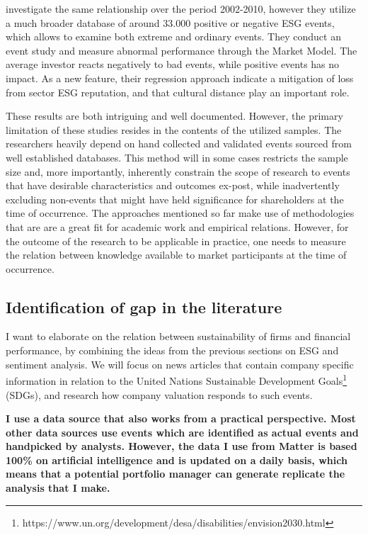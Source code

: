 \cite{Blancard_ESG_sentiment} investigate the same relationship over the period 2002-2010, however they utilize a much broader database of around 33.000 positive or negative ESG events, which allows to examine both extreme and ordinary events. They conduct an event study and measure abnormal performance through the Market Model. The average investor reacts negatively to bad events, while positive events has no impact. As a new feature, their regression approach indicate a mitigation of loss from sector ESG reputation, and that cultural distance play an important role. 

These results are both intriguing and well documented. However, the primary limitation of these studies resides in the contents of the utilized samples. The researchers heavily depend on hand collected and validated events sourced from well established databases. This method will in some cases restricts the sample size and, more importantly, inherently constrain the scope of research to events that have desirable characteristics and outcomes ex-post, while inadvertently excluding non-events that might have held significance for shareholders at the time of occurrence. The approaches mentioned so far make use of methodologies that are are a great fit for academic work and empirical relations. However, for the outcome of the research to be applicable in practice, one needs to measure the relation between knowledge available to market participants at the time of occurrence. 





\subsection{Identification of gap in the literature}


I want to elaborate on the relation between sustainability of firms and financial performance, by combining the ideas from the previous sections on ESG and sentiment analysis. We will focus on news articles that contain company specific information in relation to the United Nations Sustainable Development Goals\footnote{https://www.un.org/development/desa/disabilities/envision2030.html} (SDGs), and research how company valuation responds to such events. 


\textbf{I use a data source that also works from a practical perspective. Most other data sources use events which are identified as actual events and handpicked by analysts. However, the data I use from Matter is based 100\% on artificial intelligence and is updated on a daily basis, which means that a potential portfolio manager can generate replicate the analysis that I make.} 